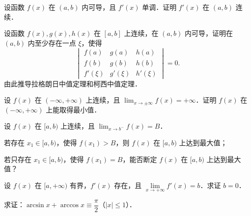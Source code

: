 \begin{xiti}
\item 设函数 $f(x)$ 在 $(a, b)$ 内可导，且 $f'(x)$ 单调．证明 $f'(x)$ 在 $(a, b)$ 连续．
\item 设函数 $f(x), g(x), h(x)$ 在 $[a, b]$ 上连续，在 $(a, b)$ 内可导，证明在 $(a, b)$ 内至少存在一点 $\xi$，使得
\[
\begin{vmatrix}
f(a) & g(a) & h(a) \\
f(b) & g(b) & h(b) \\
f'(\xi) & g'(\xi) & h'(\xi)
\end{vmatrix} = 0.
\]
由此推导拉格朗日中值定理和柯西中值定理．
\item 设 $f(x)$ 在 $(-\infty, +\infty)$ 上连续，且 $\lim_{x\to\pm\infty} f(x) = +\infty$．证明 $f(x)$ 在 $(-\infty, +\infty)$ 上能取得最小值．
\item 设 $f(x)$ 在 $[a, b)$ 上连续，且 $\lim_{x\to b^-} f(x) = B$．
\begin{ziti}
\item 若存在 $x_1 \in [a, b)$，使得 $f(x_1) > B$，则 $f(x)$ 在 $[a, b)$ 上达到最大值；
\item 若只存在 $x_1 \in [a, b)$，使得 $f(x_1) = B$，能否断定 $f(x)$ 在 $[a, b)$ 上达到最大值？
\end{ziti}
\item 设 $f(x)$ 在 $[a, +\infty)$ 有界，$f'(x)$ 存在，且 $\lim\limits_{x\to+\infty} f'(x) = b$．求证 $b = 0$．
\item 求证：$\arcsin x + \arccos x \equiv \dfrac{\pi}{2}$（$|x| \leqslant 1$）．
\end{xiti}
